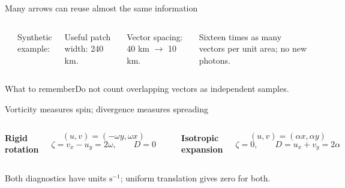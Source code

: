 \documentclass[aspectratio=169,11pt]{beamer}
\newcommand{\prov}{}
\newcommand{\evidence}[1]{\gdef\prov{#1}}
\newcommand{\takeaway}[1]{\vspace{0.3em}\begin{block}{What to remember}#1\end{block}}
\newcommand{\sone}{\mathrm{s^{-1}}}
\begin{document}
\evidence{Original synthetic oversampling example. Diagram depicts one broad support window.}
\begin{frame}{Many arrows can reuse almost the same information}
 \begin{columns}[c]
 \begin{center}
 \end{center}
 Synthetic example:\par\medskip
 Useful patch width: 240 km.\par
 Vector spacing: 40 km $\to$ 10 km.\par\medskip
 Sixteen times as many vectors per unit area; no new photons.
 \end{columns}
 \takeaway{Do not count overlapping vectors as independent samples.}
\end{frame}

\evidence{Original Cartesian vector-calculus examples. Positive normal is out of the page.}
\begin{frame}{Vorticity measures spin; divergence measures spreading}
 \begin{columns}[T]
 \textbf{Rigid rotation}\par
 \[(u,v)=(-\omega y,\omega x)\]
 \[\zeta=v_x-u_y=2\omega,\qquad D=0\]
 \begin{center}
 \end{center}
 \textbf{Isotropic expansion}\par
 \[(u,v)=(\alpha x,\alpha y)\]
 \[\zeta=0,\qquad D=u_x+v_y=2\alpha\]
 \begin{center}
 \end{center}
 \end{columns}
 Both diagnostics have units $\sone$; uniform translation gives zero for both.
\end{frame}
\end{document}
